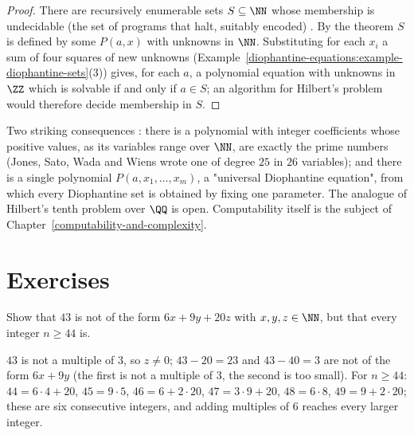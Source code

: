 \begin{proof}
There are recursively enumerable sets $S \subseteq \NN$ whose membership is undecidable (the set of programs that halt, suitably encoded) \cite{matiyasevich-hilbert}. By the theorem $S$ is defined by some
$P(a, x)$ with unknowns in $\NN$. Substituting for each $x_i$ a sum of four squares of new unknowns (Example~\ref{diophantine-equations:example-diophantine-sets}(3)) gives, for each $a$, a polynomial
equation with unknowns in $\ZZ$ which is solvable if and only if $a \in S$; an algorithm for Hilbert's problem would therefore decide membership in $S$.
\end{proof}

\begin{remark}\label{diophantine-equations:remark-hilbert-tenth}
Two striking consequences \cite{matiyasevich-hilbert}: there is a polynomial with integer coefficients whose positive values, as its variables range over $\NN$, are exactly the prime numbers (Jones, Sato, Wada
and Wiens wrote one of degree $25$ in $26$ variables); and there is a single polynomial $P(a, x_1, \dots, x_m)$, a "universal Diophantine equation", from which every Diophantine set is obtained by fixing one
parameter. The analogue of Hilbert's tenth problem over $\QQ$ is open. Computability itself is the subject of Chapter~\ref{computability-and-complexity}.
\end{remark}

\section{Exercises}\label{diophantine-equations:section-exercises}

\begin{exercise}\label{diophantine-equations:exercise-frobenius-three}
Show that $43$ is not of the form $6x + 9y + 20z$ with $x, y, z \in \NN$, but that every integer $n \geq 44$ is.
\end{exercise}

\begin{solution}
$43$ is not a multiple of $3$, so $z \neq 0$; $43 - 20 = 23$ and $43 - 40 = 3$ are not of the form $6x + 9y$ (the first is not a multiple of $3$, the second is too small). For $n \geq 44$: $44 = 6 \cdot 4 + 20$,
$45 = 9 \cdot 5$, $46 = 6 + 2 \cdot 20$, $47 = 3 \cdot 9 + 20$, $48 = 6 \cdot 8$, $49 = 9 + 2 \cdot 20$; these are six consecutive integers, and adding multiples of $6$ reaches every larger integer.
\end{solution}

